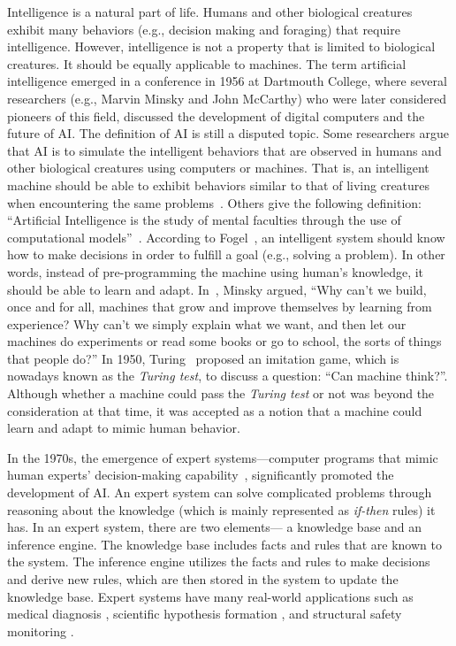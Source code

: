 Intelligence is a natural part of life. Humans and other biological creatures exhibit many behaviors (e.g., decision making and foraging) that require intelligence. However, intelligence is not a property that is limited to biological creatures. It should be equally applicable to machines. The term artificial intelligence emerged in a conference in 1956 at Dartmouth College, where several researchers (e.g., Marvin Minsky and John McCarthy) who were later considered pioneers of this field, discussed the development of digital computers and the future of AI. The definition of AI is still a disputed topic.  Some researchers argue that AI is to simulate the intelligent behaviors that are observed in humans and other biological creatures using computers or machines. That is, an intelligent machine should be able to exhibit behaviors similar to that of living creatures when encountering the same problems~\cite{Schildt1985}. Others give the following definition: ``Artificial Intelligence is the study of mental faculties through the use of computational models''~\cite{Charniak1985}. According to Fogel~\cite{Fogel1995}, an intelligent system should know how to make decisions in order to fulfill a goal (e.g., solving a problem). In other words, instead of pre-programming the machine using human's knowledge, it should be able to learn and adapt. In~\cite{Minsky_1991}, Minsky argued, ``Why can't we build, once and for all, machines that grow and improve themselves by learning from experience? Why can't we simply explain what we want, and then let our machines do experiments or read some books or go to school, the sorts of things that people do?'' In 1950, Turing~\cite{Turing_1950} proposed an imitation game, which is nowadays known as the \textit{Turing test}, to discuss a question: ``Can machine think?''. Although whether a machine could pass the \textit{Turing test} or not was beyond the consideration at that time, it was accepted as a notion that a machine could learn and adapt to mimic human behavior. %

In the 1970s, the emergence of expert systems---computer programs that mimic human experts' decision-making capability~\cite{Jackson1998}, significantly promoted the development of AI. An expert system can solve complicated problems through reasoning about the knowledge (which is mainly represented as \textit{if-then} rules) it has. In an expert system, there are two elements--- a knowledge base and an inference engine. The knowledge base includes facts and rules that are known to the system. The inference engine utilizes the facts and rules to make decisions and derive new rules, which are then stored in the system to update the knowledge base. Expert systems have many real-world applications such as medical diagnosis \cite{Jonathan1990}, scientific hypothesis formation \cite{Robert1993}, and structural safety monitoring \cite{Salvaneschi1996}. 

